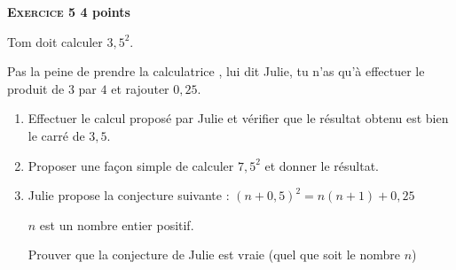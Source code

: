 \textbf{\textsc{Exercice 5} \hfill 4 points}

\bigskip
 
Tom doit calculer $3,5^2$.
 
\og Pas la peine de prendre la calculatrice \fg, lui dit Julie, tu n'as qu'à effectuer le produit de $3$ par $4$ et rajouter $0,25$. 

\medskip

\begin{enumerate}
\item Effectuer le calcul proposé par Julie et vérifier que le résultat obtenu est bien le carré de $3,5$. 
\item Proposer une façon simple de calculer $7,5^2$ et donner le résultat. 
\item Julie propose la conjecture suivante : 	$(n + 0,5)^2 = n(n + 1) + 0,25$ 

$n$ est un nombre entier positif. 

Prouver que la conjecture de Julie est vraie (quel que soit le nombre $n$) 
\end{enumerate} 

\bigskip

